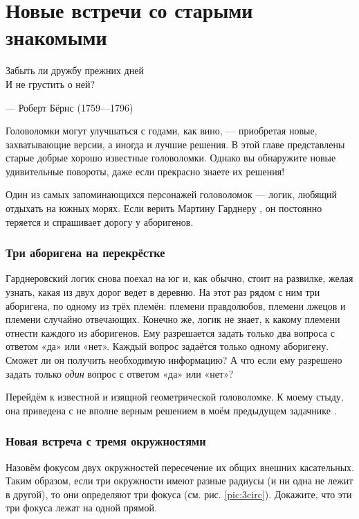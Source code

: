 \chapter{Новые встречи со старыми знакомыми}
\setlength{\epigraphwidth}{.53\textwidth}
\epigraph{Забыть ли дружбу прежних дней\\
И не грустить о ней?}{--- Роберт Бёрнс (1759---1796)}

Головоломки могут улучшаться с годами, как вино, --- приобретая новые, захватывающие версии, а иногда и лучшие решения.
В этой главе представлены старые добрые хорошо известные головоломки.
Однако вы обнаружите новые удивительные повороты, даже если прекрасно знаете их решения!

Один из самых запоминающихся персонажей головоломок --- логик, любящий отдыхать на южных морях.
Если верить Мартину Гарднеру \cite{27}, он постоянно теряется и спрашивает дорогу у аборигенов.

\subsection*{Три аборигена на перекрёстке}

Гарднеровский логик снова поехал на юг и, как обычно, стоит на развилке, желая узнать,  какая из двух дорог ведет в деревню.
На этот раз рядом с ним три аборигена, по одному из трёх племён:
племени правдолюбов,
племени лжецов
и племени случайно отвечающих.
Конечно же, логик не знает, к какому племени отнести каждого из аборигенов.
Ему разрешается задать только два вопроса с ответом «да» или «нет».
Каждый вопрос задаётся только одному аборигену.
Сможет ли он получить необходимую информацию?
А что если ему разрешено задать только \emph{один} вопрос с ответом «да» или «нет»?

\medskip

Перейдём к известной и изящной геометрической головоломке.
К моему стыду, она приведена с не вполне верным решением в моём предыдущем задачнике \cite{59}.

\subsection*{Новая встреча с тремя окружностями}

Назовём фокусом двух окружностей пересечение их общих внешних касательных.
Таким образом, если три окружности имеют разные радиусы (и ни одна не лежит в другой), то они определяют три фокуса (см. рис. \ref{pic:3circ}).
Докажите, что эти три фокуса лежат на одной прямой.

